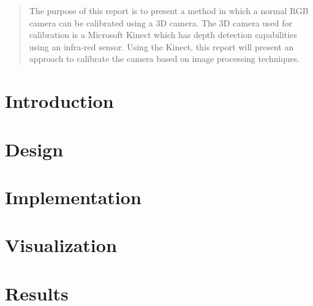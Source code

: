 \documentclass[a4paper,11pt]{report}
\begin{document}
\maketitle

\begin{abstract}
The purpose of this report is to present a method in which a normal RGB camera can be calibrated using a 3D camera. The 3D camera used for calibration is a Microsoft Kinect which has depth detection capabilities using an infra-red sensor. Using the Kinect, this report will present an approach to calibrate the camera based on image processing techniques. 
\end{abstract}

\chapter{Introduction}


\chapter{Design}


\chapter{Implementation}


\chapter{Visualization}


\chapter{Results}

\end{document}
